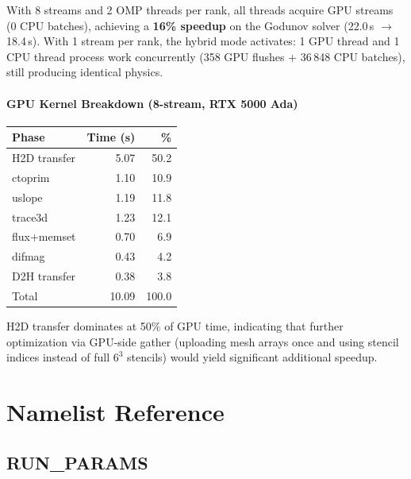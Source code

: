 \documentclass[11pt,fleqn]{book}
\begin{document}
With 8 streams and 2 OMP threads per rank, all threads acquire GPU streams (0 CPU batches), achieving a \textbf{16\% speedup} on the Godunov solver (22.0\,s $\to$ 18.4\,s).  With 1 stream per rank, the hybrid mode activates: 1 GPU thread and 1 CPU thread process work concurrently (358 GPU flushes + 36\,848 CPU batches), still producing identical physics.

\subsection{GPU Kernel Breakdown (8-stream, RTX 5000 Ada)}

\begin{center}
\begin{tabular}{lrr}
\toprule
\textbf{Phase} & \textbf{Time (s)} & \textbf{\%} \\
\midrule
H2D transfer        & 5.07  & 50.2 \\
ctoprim             & 1.10  & 10.9 \\
uslope              & 1.19  & 11.8 \\
trace3d             & 1.23  & 12.1 \\
flux+memset         & 0.70  &  6.9 \\
difmag              & 0.43  &  4.2 \\
D2H transfer        & 0.38  &  3.8 \\
\midrule
Total               & 10.09 & 100.0 \\
\bottomrule
\end{tabular}
\end{center}

H2D transfer dominates at 50\% of GPU time, indicating that further optimization via GPU-side gather (uploading mesh arrays once and using stencil indices instead of full $6^3$ stencils) would yield significant additional speedup.


\part{Namelist Reference}

\chapter{RUN\_PARAMS}
\end{document}
